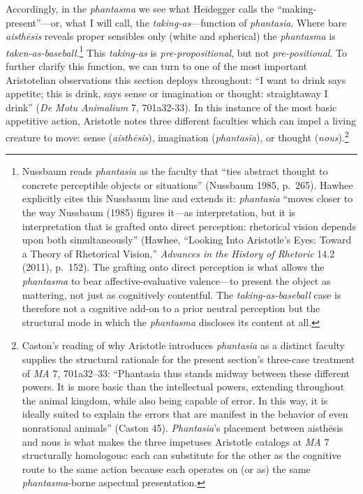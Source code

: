Accordingly, in the \textit{phantasma} we see what Heidegger calls the ``making-present''---or, what I will call, the \textit{taking-as}---function of \textit{phantasia}. Where bare \textit{aisthēsis} reveals proper sensibles only (white and spherical) the \textit{phantasma} is \textit{taken-as-baseball}.\footnote{Nussbaum reads \textit{phantasia} as the faculty that ``ties abstract thought to concrete perceptible objects or situations'' (Nussbaum 1985, p.~265). Hawhee explicitly cites this Nussbaum line and extends it: \textit{phantasia} ``moves closer to the way Nussbaum (1985) figures it---as interpretation, but it is interpretation that is grafted onto direct perception: rhetorical vision depends upon both simultaneously'' (Hawhee, ``Looking Into Aristotle's Eyes: Toward a Theory of Rhetorical Vision,'' \textit{Advances in the History of Rhetoric} 14.2 (2011), p.~152). The grafting onto direct perception is what allows the \textit{phantasma} to bear affective-evaluative valence---to present the object as mattering, not just as cognitively contentful. The \textit{taking-as-baseball} case is therefore not a cognitive add-on to a prior neutral perception but the structural mode in which the \textit{phantasma} discloses its content at all.} This \textit{taking-as} is \textit{pre-propositional}, but not \textit{pre-positional}. To further clarify this function, we can turn to one of the most important Aristotelian observations this section deploys throughout: ``I want to drink says appetite; this is drink, says sense or imagination or thought: straightaway I drink'' (\textit{De Motu Animalium} 7, 701a32-33). In this instance of the most basic appetitive action, Aristotle notes three different faculties which can impel a living creature to move: sense (\textit{aisthēsis}), imagination (\textit{phantasia}), or thought (\textit{nous}).\footnote{Caston's reading of why Aristotle introduces \textit{phantasia} as a distinct faculty supplies the structural rationale for the present section's three-case treatment of \textit{MA} 7, 701a32--33: ``Phantasia thus stands midway between these different powers. It is more basic than the intellectual powers, extending throughout the animal kingdom, while also being capable of error. In this way, it is ideally suited to explain the errors that are manifest in the behavior of even nonrational animals'' (Caston 45). \textit{Phantasia}'s placement between aisthēsis and nous is what makes the three impetuses Aristotle catalogs at \textit{MA} 7 structurally homologous: each can substitute for the other as the cognitive route to the same action because each operates on (or as) the same \textit{phantasma}-borne aspectual presentation.} 

